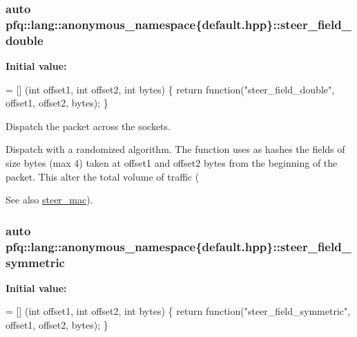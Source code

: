 \subsubsection[{\texorpdfstring{steer\+\_\+field\+\_\+double}{steer_field_double}}]{\setlength{\rightskip}{0pt plus 5cm}auto pfq\+::lang\+::anonymous\+\_\+namespace\{default.\+hpp\}\+::steer\+\_\+field\+\_\+double}\hypertarget{namespacepfq_1_1lang_1_1anonymous__namespace_02default_8hpp_03_aabbf7feb753f3c5b1b40cfa8a54581e5}{}\label{namespacepfq_1_1lang_1_1anonymous__namespace_02default_8hpp_03_aabbf7feb753f3c5b1b40cfa8a54581e5}
{\bfseries Initial value\+:}
\begin{DoxyCode}
= [] (\textcolor{keywordtype}{int} offset1, \textcolor{keywordtype}{int} offset2, \textcolor{keywordtype}{int} bytes) \{
                                \textcolor{keywordflow}{return} \textcolor{keyword}{function}(\textcolor{stringliteral}{"steer\_field\_double"}, offset1, offset2, bytes);
                           \}
\end{DoxyCode}


Dispatch the packet across the sockets. 

Dispatch with a randomized algorithm. The function uses as hashes the fields of {\ttfamily size} bytes (max 4) taken at {\ttfamily offset1} and {\ttfamily offset2} bytes from the beginning of the packet. This alter the total volume of traffic (\begin{DoxySeeAlso}{See also}
\hyperlink{namespacepfq_1_1lang_1_1anonymous__namespace_02default_8hpp_03_ad51e91e3b485c729ac1ba39a46e337a0}{steer\+\_\+mac}). 
\end{DoxySeeAlso}
\subsubsection[{\texorpdfstring{steer\+\_\+field\+\_\+symmetric}{steer_field_symmetric}}]{\setlength{\rightskip}{0pt plus 5cm}auto pfq\+::lang\+::anonymous\+\_\+namespace\{default.\+hpp\}\+::steer\+\_\+field\+\_\+symmetric}\hypertarget{namespacepfq_1_1lang_1_1anonymous__namespace_02default_8hpp_03_a422c7bafe8240549d193903890f9ec48}{}\label{namespacepfq_1_1lang_1_1anonymous__namespace_02default_8hpp_03_a422c7bafe8240549d193903890f9ec48}
{\bfseries Initial value\+:}
\begin{DoxyCode}
= [] (\textcolor{keywordtype}{int} offset1, \textcolor{keywordtype}{int} offset2, \textcolor{keywordtype}{int} bytes) \{
                                \textcolor{keywordflow}{return} \textcolor{keyword}{function}(\textcolor{stringliteral}{"steer\_field\_symmetric"}, offset1, offset2, bytes);
                           \}
\end{DoxyCode}


